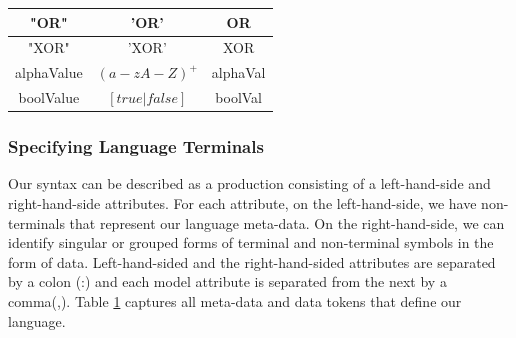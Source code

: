 \documentclass[conference]{IEEEtran}
\begin{document}
\begin{table}[H]
\begin{center}
\begin{tabular}{|c|c|c|}
                              "OR" & 'OR' & OR\\ \hline
                              "XOR" & 'XOR' & XOR\\ \hline
                              alphaValue & $(a-zA-Z)^+$ & alphaVal\\ \hline
                              boolValue & $[true | false]$ & boolVal\\ \hline
\end{tabular}
\label{tab:langlex}
\end{center}
\end{table}

\subsubsection{Specifying Language Terminals}
Our syntax can be described as a production consisting of a left-hand-side and right-hand-side attributes. For each attribute, on the left-hand-side, we have non-terminals that represent our language meta-data. On the right-hand-side, we can identify singular or grouped forms of terminal and non-terminal symbols in the form of data. Left-hand-sided and the right-hand-sided attributes are separated by a colon (:) and each model attribute is separated from the next by a comma(,). Table \ref{tab:langlex} captures all meta-data and data tokens that define our language.
\end{document}

